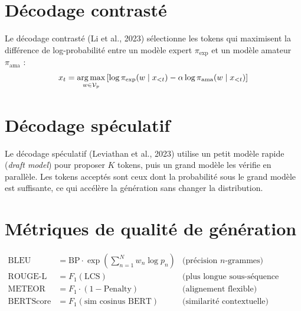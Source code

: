 \section{D\'ecodage contrast\'e}
\label{sec:gen:contrastive}

\begin{definition}
Le d\'ecodage contrast\'e (Li et al., 2023) s\'electionne les tokens qui
maximisent la diff\'erence de log-probabilit\'e entre un mod\`ele expert
$\pi_{\text{exp}}$ et un mod\`ele amateur $\pi_{\text{ama}}$ :
\[
x_t = \operatorname*{arg\,max}_{w \in \mathcal{V}_p} \left[\log \pi_{\text{exp}}(w \mid x_{<t}) - \alpha \log \pi_{\text{ama}}(w \mid x_{<t})\right]
\]
\end{definition}

\section{D\'ecodage sp\'eculatif}
\label{sec:gen:speculative}

\begin{definition}
Le d\'ecodage sp\'eculatif (Leviathan et al., 2023) utilise un petit mod\`ele
rapide (\emph{draft model}) pour proposer $K$ tokens, puis un grand mod\`ele
les v\'erifie en parall\`ele. Les tokens accept\'es sont ceux dont la probabilit\'e
sous le grand mod\`ele est suffisante, ce qui acc\'el\`ere la g\'en\'eration
sans changer la distribution.
\end{definition}

\section{M\'etriques de qualit\'e de g\'en\'eration}
\label{sec:gen:metriques}

\begin{formules}[title=\textbf{M\'etriques de g\'en\'eration}]
\begin{align}
\text{BLEU} &= \text{BP} \cdot \exp\!\left(\sum_{n=1}^{N} w_n \log p_n\right) & \text{(pr\'ecision $n$-grammes)} \\
\text{ROUGE-L} &= F_1(\text{LCS}) & \text{(plus longue sous-s\'equence commune)} \\
\text{METEOR} &= F_1 \cdot (1 - \text{Penalty}) & \text{(alignement flexible)} \\
\text{BERTScore} &= F_1(\text{sim cosinus BERT}) & \text{(similarit\'e contextuelle)}
\end{align}
\end{formules}

